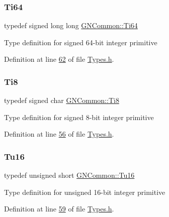 \subsubsection{\texorpdfstring{Ti64}{Ti64}}
{\footnotesize\ttfamily typedef signed long long \mbox{\hyperlink{namespace_g_n_common_ad0a34f67eefe81cfbd0e515bba246d9d}{G\+N\+Common\+::\+Ti64}}}

Type definition for signed 64-\/bit integer primitive 

Definition at line \mbox{\hyperlink{_types_8h_source_l00062}{62}} of file \mbox{\hyperlink{_types_8h_source}{Types.\+h}}.

\mbox{\label{namespace_g_n_common_a9bac2aa36db6d72a3e59b1869adf3668}} 
\subsubsection{\texorpdfstring{Ti8}{Ti8}}
{\footnotesize\ttfamily typedef signed char \mbox{\hyperlink{namespace_g_n_common_a9bac2aa36db6d72a3e59b1869adf3668}{G\+N\+Common\+::\+Ti8}}}

Type definition for signed 8-\/bit integer primitive 

Definition at line \mbox{\hyperlink{_types_8h_source_l00056}{56}} of file \mbox{\hyperlink{_types_8h_source}{Types.\+h}}.

\mbox{\label{namespace_g_n_common_a7f651a58155939d1e0e2bf2164fbfdbf}} 
\subsubsection{\texorpdfstring{Tu16}{Tu16}}
{\footnotesize\ttfamily typedef unsigned short \mbox{\hyperlink{namespace_g_n_common_a7f651a58155939d1e0e2bf2164fbfdbf}{G\+N\+Common\+::\+Tu16}}}

Type definition for unsigned 16-\/bit integer primitive 

Definition at line \mbox{\hyperlink{_types_8h_source_l00059}{59}} of file \mbox{\hyperlink{_types_8h_source}{Types.\+h}}.

\mbox{\label{namespace_g_n_common_a941b527ef318f318aed7903dc832b7e4}} 
